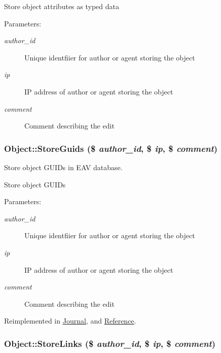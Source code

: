 Store object attributes as typed data

\begin{Desc}
\item[Parameters:]
\begin{description}
\item[{\em author\_\-id}]Unique identfiier for author or agent storing the object \item[{\em ip}]IP address of author or agent storing the object \item[{\em comment}]Comment describing the edit \end{description}
\end{Desc}
\hypertarget{class_object_dedb212835b4a878c89f7682ae11f772}{
\subsubsection{\setlength{\rightskip}{0pt plus 5cm}Object::StoreGuids (\$ {\em author\_\-id}, \/  \$ {\em ip}, \/  \$ {\em comment})}}
\label{class_object_dedb212835b4a878c89f7682ae11f772}


Store object GUIDs in EAV database. 

Store object GUIDs

\begin{Desc}
\item[Parameters:]
\begin{description}
\item[{\em author\_\-id}]Unique identfiier for author or agent storing the object \item[{\em ip}]IP address of author or agent storing the object \item[{\em comment}]Comment describing the edit \end{description}
\end{Desc}


Reimplemented in \hyperlink{class_journal_b182da20eb5ceb7d1709e102a4666344}{Journal}, and \hyperlink{class_reference_eb3baaf7d34623479bbeaeccf8bbd070}{Reference}.\hypertarget{class_object_b969bdfbdff62485da5de7e12f1ea68d}{
\subsubsection{\setlength{\rightskip}{0pt plus 5cm}Object::StoreLinks (\$ {\em author\_\-id}, \/  \$ {\em ip}, \/  \$ {\em comment})}}
\label{class_object_b969bdfbdff62485da5de7e12f1ea68d}


